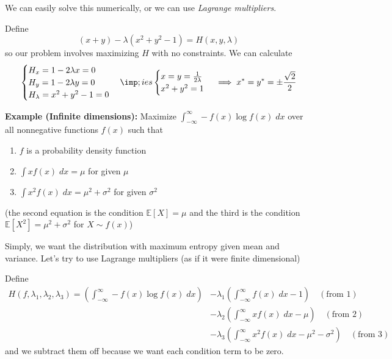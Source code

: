 \documentclass[12pt]{article}
\newcommand{\E}{\mathbb{E}}
\begin{document}
        We can easily solve this numerically, or we can use \emph{Lagrange multipliers}. 
        
        Define
        \[(x + y) - \lambda(x^2 + y^2 - 1) = H(x, y, \lambda)\]
        so our problem involves maximizing $H$ with no constraints. We can calculate 
        \[\begin{cases}
            H_x = 1 - 2\lambda x = 0\\ 
            H_y = 1 - 2\lambda y = 0\\
            H_{\lambda} = x^2 + y^2 - 1 = 0
        \end{cases} \imp;ies \begin{cases}
            x = y = \frac{1}{2\lambda}\\ 
            x^2 + y^2 = 1
        \end{cases} \implies x^* = y^* = \pm \frac{\sqrt 2}{2}\]

        \textbf{Example (Infinite dimensions):} Maximize $\int_{-\infty}^{\infty} -f(x) \log f(x) \; dx$ over all nonnegative functions $f(x)$ such that 
        \begin{enumerate}
            \item $f$ is a probability density function
            \item $\int x f(x)\; dx = \mu$ for given $\mu$ 
            \item $\int x^2 f(x) \; dx = \mu^2 + \sigma^2$ for given $\sigma^2$
        \end{enumerate} 
        (the second equation is the condition $\E[X] = \mu$ and the third is the condition $\E[X^2] = \mu^2 + \sigma^2$ for $X \sim f(x)$) 

        Simply, we want the distribution with maximum entropy given mean and variance. Let's try to use Lagrange multipliers (as if it were finite dimensional) 

        Define 
        \begin{align*}
            H(f, \lambda_1, \lambda_2, \lambda_3) = \left(\int_{-\infty}^{\infty} -f(x)\log f(x)\; dx\right) &- \lambda_1\left(\int_{-\infty}^{\infty} f(x)\; dx - 1\right) \quad (\text{from 1})\\ 
            &- \lambda_2 \left(\int_{-\infty}^{\infty} xf(x)\; dx - \mu\right) \quad (\text{from 2})\\ 
            &- \lambda_3 \left(\int_{-\infty}^{\infty} x^2 f(x)\; dx - \mu^2 - \sigma^2\right) \quad (\text{from 3})
        \end{align*}
        and we subtract them off because we want each condition term to be zero. 
\end{document}
